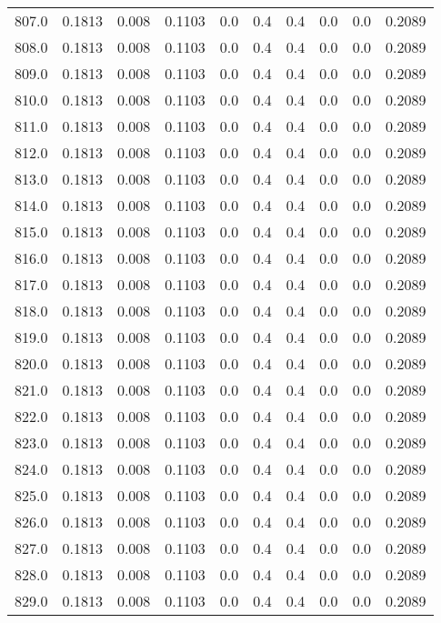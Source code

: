 \begin{longtable}{lrrrrrrrrr}
807.0 & 0.1813 & 0.008 & 0.1103 & 0.0 & 0.4 & 0.4 & 0.0 & 0.0 & 0.2089 \\
808.0 & 0.1813 & 0.008 & 0.1103 & 0.0 & 0.4 & 0.4 & 0.0 & 0.0 & 0.2089 \\
809.0 & 0.1813 & 0.008 & 0.1103 & 0.0 & 0.4 & 0.4 & 0.0 & 0.0 & 0.2089 \\
810.0 & 0.1813 & 0.008 & 0.1103 & 0.0 & 0.4 & 0.4 & 0.0 & 0.0 & 0.2089 \\
811.0 & 0.1813 & 0.008 & 0.1103 & 0.0 & 0.4 & 0.4 & 0.0 & 0.0 & 0.2089 \\
812.0 & 0.1813 & 0.008 & 0.1103 & 0.0 & 0.4 & 0.4 & 0.0 & 0.0 & 0.2089 \\
813.0 & 0.1813 & 0.008 & 0.1103 & 0.0 & 0.4 & 0.4 & 0.0 & 0.0 & 0.2089 \\
814.0 & 0.1813 & 0.008 & 0.1103 & 0.0 & 0.4 & 0.4 & 0.0 & 0.0 & 0.2089 \\
815.0 & 0.1813 & 0.008 & 0.1103 & 0.0 & 0.4 & 0.4 & 0.0 & 0.0 & 0.2089 \\
816.0 & 0.1813 & 0.008 & 0.1103 & 0.0 & 0.4 & 0.4 & 0.0 & 0.0 & 0.2089 \\
817.0 & 0.1813 & 0.008 & 0.1103 & 0.0 & 0.4 & 0.4 & 0.0 & 0.0 & 0.2089 \\
818.0 & 0.1813 & 0.008 & 0.1103 & 0.0 & 0.4 & 0.4 & 0.0 & 0.0 & 0.2089 \\
819.0 & 0.1813 & 0.008 & 0.1103 & 0.0 & 0.4 & 0.4 & 0.0 & 0.0 & 0.2089 \\
820.0 & 0.1813 & 0.008 & 0.1103 & 0.0 & 0.4 & 0.4 & 0.0 & 0.0 & 0.2089 \\
821.0 & 0.1813 & 0.008 & 0.1103 & 0.0 & 0.4 & 0.4 & 0.0 & 0.0 & 0.2089 \\
822.0 & 0.1813 & 0.008 & 0.1103 & 0.0 & 0.4 & 0.4 & 0.0 & 0.0 & 0.2089 \\
823.0 & 0.1813 & 0.008 & 0.1103 & 0.0 & 0.4 & 0.4 & 0.0 & 0.0 & 0.2089 \\
824.0 & 0.1813 & 0.008 & 0.1103 & 0.0 & 0.4 & 0.4 & 0.0 & 0.0 & 0.2089 \\
825.0 & 0.1813 & 0.008 & 0.1103 & 0.0 & 0.4 & 0.4 & 0.0 & 0.0 & 0.2089 \\
826.0 & 0.1813 & 0.008 & 0.1103 & 0.0 & 0.4 & 0.4 & 0.0 & 0.0 & 0.2089 \\
827.0 & 0.1813 & 0.008 & 0.1103 & 0.0 & 0.4 & 0.4 & 0.0 & 0.0 & 0.2089 \\
828.0 & 0.1813 & 0.008 & 0.1103 & 0.0 & 0.4 & 0.4 & 0.0 & 0.0 & 0.2089 \\
829.0 & 0.1813 & 0.008 & 0.1103 & 0.0 & 0.4 & 0.4 & 0.0 & 0.0 & 0.2089 \\

\end{longtable}

